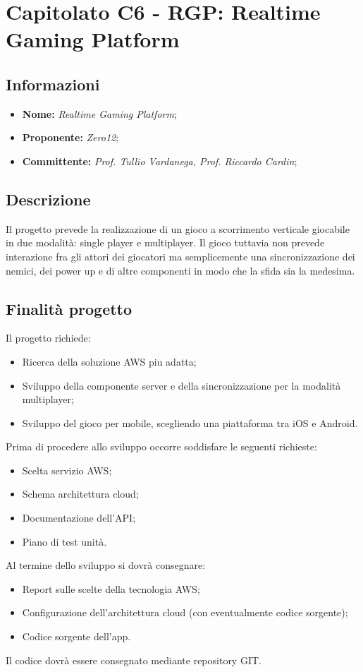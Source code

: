 \section{Capitolato C6 - RGP: Realtime Gaming Platform}
\subsection{Informazioni}
\begin{itemize}
    \item \textbf{Nome:} \textit{Realtime Gaming Platform}; 
    \item \textbf{Proponente:} \textit{Zero12};
    \item \textbf{Committente:} \textit{Prof. Tullio Vardanega, Prof. Riccardo Cardin};
\end{itemize}
\subsection{Descrizione}
Il progetto prevede la realizzazione di un gioco a scorrimento verticale giocabile in due modalità: single player e multiplayer. Il gioco tuttavia non prevede interazione fra gli attori dei giocatori ma semplicemente una sincronizzazione dei nemici, dei power up e di altre componenti in modo che la sfida sia la medesima.
\subsection{Finalità progetto}
Il progetto richiede:
\begin{itemize}
    \item Ricerca della soluzione AWS piu adatta;
    \item Sviluppo della componente server e della sincronizzazione per la modalità multiplayer;
    \item Sviluppo del gioco per mobile, scegliendo una piattaforma tra iOS e Android.
\end{itemize}
Prima di procedere allo sviluppo occorre soddisfare le seguenti richieste:
\begin{itemize}
    \item Scelta servizio AWS;
    \item Schema architettura cloud;
    \item Documentazione dell'API;
    \item Piano di test unità.
\end{itemize}
Al termine dello sviluppo si dovrà consegnare:
\begin{itemize}
    \item Report sulle scelte della tecnologia AWS;
    \item Configurazione dell'architettura cloud (con eventualmente codice sorgente);
    \item Codice sorgente dell'app.
\end{itemize}
Il codice dovrà essere consegnato mediante repository GIT.

